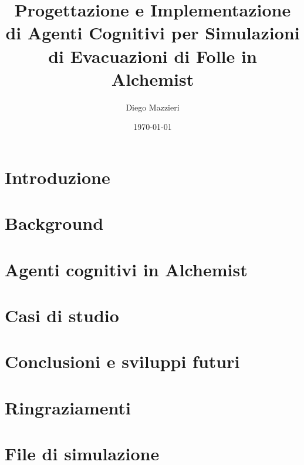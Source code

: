 \documentclass[12pt,a4paper,openright,twoside]{report}
\begin{document}
\title{Progettazione e Implementazione di Agenti Cognitivi per Simulazioni di Evacuazioni di Folle in Alchemist}
\author{Diego Mazzieri}
\date{\today}

\begin{titlepage}

\end{titlepage}

\oddsidemargin=0pt
\evensidemargin=0pt

\begin{titlepage}
\end{titlepage}

\chapter*{Introduzione}


\tableofcontents
{}


\chapter{Background}


\chapter{Agenti cognitivi in Alchemist}


\chapter{Casi di studio}


\chapter{Conclusioni e sviluppi futuri}


\printbibliography
{}

\chapter*{Ringraziamenti}


\appendix
\chapter{File di simulazione}

\end{document}
